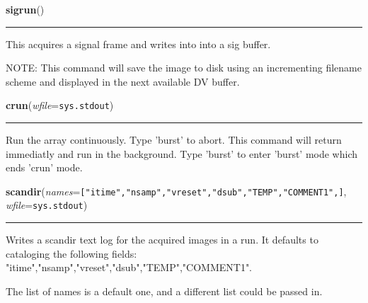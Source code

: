     \label{runrun:sigrun}

    \vspace{0.5ex}

    \begin{boxedminipage}{\textwidth}

    \raggedright \textbf{sigrun}()

    \vspace{-1.5ex}

    \rule{\textwidth}{0.5\fboxrule}
    This acquires a signal frame and writes into into a sig buffer.

    NOTE: This command will save the image to disk using an incrementing 
    filename scheme and displayed in the next available DV buffer.

    \vspace{1ex}

    \end{boxedminipage}

    \label{runrun:crun}

    \vspace{0.5ex}

    \begin{boxedminipage}{\textwidth}

    \raggedright \textbf{crun}(\textit{wfile}=\texttt{sys.stdout})

    \vspace{-1.5ex}

    \rule{\textwidth}{0.5\fboxrule}
    Run the array continuously. Type 'burst' to abort. This command will 
    return immediatly and run in the background. Type 'burst' to enter 
    'burst' mode which ends 'crun' mode.

    \vspace{1ex}

    \end{boxedminipage}

    \label{runrun:scandir}

    \vspace{0.5ex}

    \begin{boxedminipage}{\textwidth}

    \raggedright \textbf{scandir}(\textit{names}=\texttt{["itime","nsamp","vreset","dsub","TEMP","COMMENT1",]}, \textit{wfile}=\texttt{sys.stdout})

    \vspace{-1.5ex}

    \rule{\textwidth}{0.5\fboxrule}
    Writes a scandir text log for the acquired images in a run. It defaults
    to cataloging the following fields: 
    "itime","nsamp","vreset","dsub","TEMP","COMMENT1".

    The list of names is a default one, and a different list could be 
    passed in.

    \vspace{1ex}

    \end{boxedminipage}


